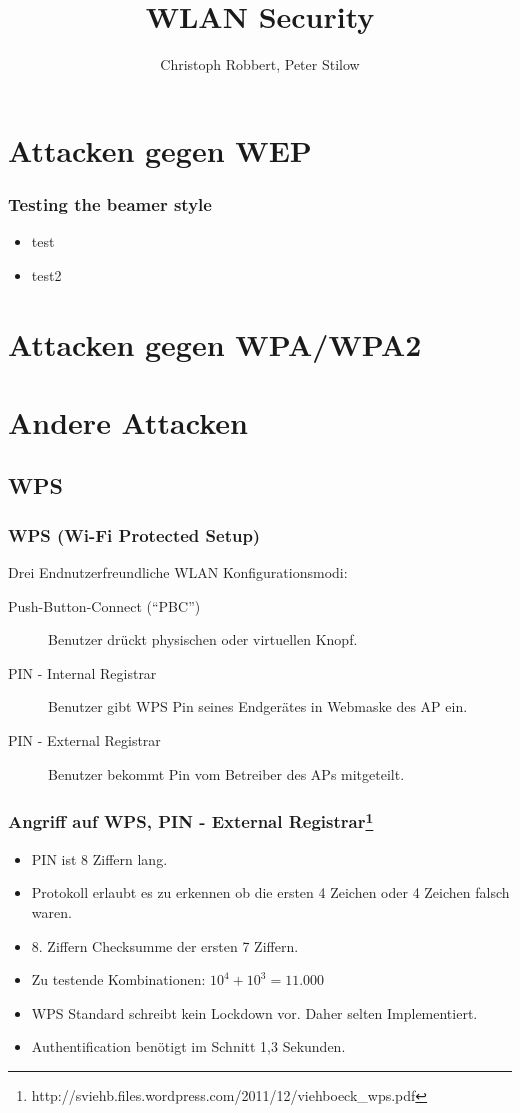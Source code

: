 \documentclass{beamer}
\author[C.Robbert, P. Stilow]{Christoph Robbert, Peter Stilow}
\institute[Uni Paderborn]{Universität Paderborn}
\title[WLAN Security]{WLAN Security}
\begin{document}
\begin{frame}
\maketitle
\end{frame}
\section{Attacken gegen WEP}
\begin{frame}
\frametitle{Testing the beamer style}
\begin{itemize}
	\item test
	\item test2
\end{itemize}
\end{frame}

\section{Attacken gegen WPA/WPA2}

\section{Andere Attacken}
\subsection{WPS}
\begin{frame}
\frametitle{WPS (Wi-Fi Protected Setup)}
Drei Endnutzerfreundliche WLAN Konfigurationsmodi:
\begin{description}
	\item[Push-Button-Connect (“PBC”)] Benutzer drückt physischen oder virtuellen Knopf.
	\item[PIN - Internal Registrar] Benutzer gibt WPS Pin seines Endgerätes in Webmaske des AP ein.
	\item[PIN - External Registrar] Benutzer bekommt Pin vom Betreiber des APs mitgeteilt.
\end{description}

\end{frame}
\begin{frame}
\frametitle{Angriff auf WPS, PIN - External Registrar\footnote{http://sviehb.files.wordpress.com/2011/12/viehboeck\_wps.pdf}}
\begin{itemize}
	\item PIN ist 8 Ziffern lang.
	\item Protokoll erlaubt es zu erkennen ob die ersten 4 Zeichen oder 4 Zeichen falsch waren.
	\item 8. Ziffern Checksumme der ersten 7 Ziffern.
	\item Zu testende Kombinationen: $10^4+10^3 = 11.000$
	\item WPS Standard schreibt kein Lockdown vor. Daher selten Implementiert.
	\item Authentification benötigt im Schnitt 1,3 Sekunden.
\end{itemize}
\end{frame}
\end{document}
